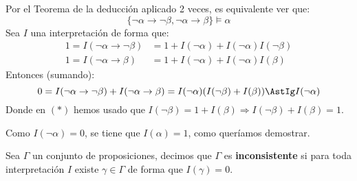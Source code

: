 \begin{ejemplo}
\begin{description}
            Por el Teorema de la deducción aplicado 2 veces, es equivalente ver que:
            \begin{equation*}
                \{\lnot\alpha\to\lnot\beta,\lnot\alpha\to\beta\} \vDash \alpha
            \end{equation*}
            Sea $I$ una interpretación de forma que:
            \begin{align*}
                1 = I(\lnot\alpha\to\lnot\beta) &= 1 + I(\lnot\alpha) + I(\lnot\alpha)I(\lnot\beta) \\
                1 = I(\lnot\alpha\to\beta) &= 1 + I(\lnot\alpha) + I(\lnot\alpha)I(\beta)
            \end{align*}
            Entonces (sumando):
            \begin{equation*}
                0 = I(\lnot\alpha\to\lnot\beta) + I(\lnot\alpha\to\beta) = I(\lnot\alpha)(I(\lnot\beta) + I(\beta)) \AstIg I(\lnot\alpha)
            \end{equation*}
            Donde en $(\ast)$ hemos usado que $I(\lnot\beta) = 1 + I(\beta)\Longrightarrow I(\lnot\beta)+I(\beta)=1$.

            Como $I(\lnot\alpha)=0$, se tiene que $I(\alpha)=1$, como queríamos demostrar.
    \end{description}
\end{ejemplo}

\begin{definicion}
    Sea $\Gamma$ un conjunto de proposiciones, decimos que $\Gamma$ es \textbf{inconsistente} si para toda interpretación $I$ existe $\gamma\in \Gamma$ de forma que $I(\gamma)=0$.
\end{definicion}

